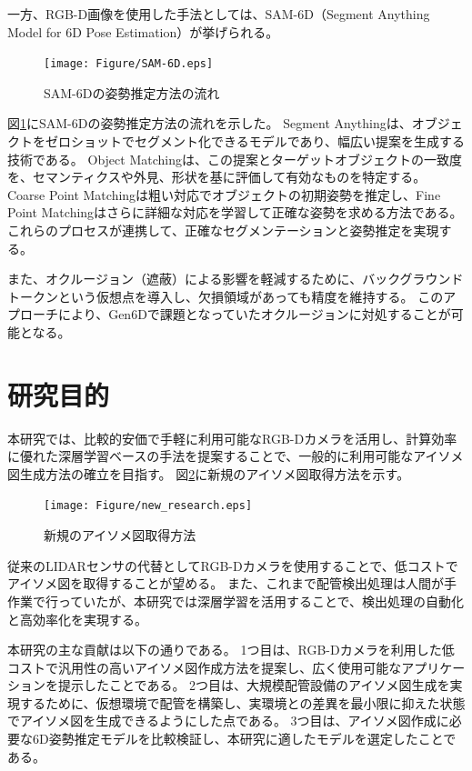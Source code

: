 一方、RGB-D画像を使用した手法としては、SAM-6D（Segment Anything Model for 6D Pose Estimation）が挙げられる。
\begin{figure}[htbt]
	\centering
	 \texttt{[image: Figure/SAM-6D.eps]}
	 \caption{SAM-6Dの姿勢推定方法の流れ}
	 \label{fig:f7}
\end{figure}

図\ref{fig:f7}にSAM-6Dの姿勢推定方法の流れを示した。
Segment Anythingは、オブジェクトをゼロショットでセグメント化できるモデルであり、幅広い提案を生成する技術である。
Object Matchingは、この提案とターゲットオブジェクトの一致度を、セマンティクスや外見、形状を基に評価して有効なものを特定する。
Coarse Point Matchingは粗い対応でオブジェクトの初期姿勢を推定し、Fine Point Matchingはさらに詳細な対応を学習して正確な姿勢を求める方法である。
これらのプロセスが連携して、正確なセグメンテーションと姿勢推定を実現する。

また、オクルージョン（遮蔽）による影響を軽減するために、バックグラウンドトークンという仮想点を導入し、欠損領域があっても精度を維持する。
このアプローチにより、Gen6Dで課題となっていたオクルージョンに対処することが可能となる。


\section{研究目的}
本研究では、比較的安価で手軽に利用可能なRGB-Dカメラを活用し、計算効率に優れた深層学習ベースの手法を提案することで、一般的に利用可能なアイソメ図生成方法の確立を目指す。
図\ref{fig:f8}に新規のアイソメ図取得方法を示す。\\
\begin{figure}[htbt]
	\centering
	 \texttt{[image: Figure/new\_research.eps]}
	 \caption{新規のアイソメ図取得方法}
	 \label{fig:f8}
\end{figure}

従来のLIDARセンサの代替としてRGB-Dカメラを使用することで、低コストでアイソメ図を取得することが望める。
また、これまで配管検出処理は人間が手作業で行っていたが、本研究では深層学習を活用することで、検出処理の自動化と高効率化を実現する。

本研究の主な貢献は以下の通りである。
1つ目は、RGB-Dカメラを利用した低コストで汎用性の高いアイソメ図作成方法を提案し、広く使用可能なアプリケーションを提示したことである。
2つ目は、大規模配管設備のアイソメ図生成を実現するために、仮想環境で配管を構築し、実環境との差異を最小限に抑えた状態でアイソメ図を生成できるようにした点である。
3つ目は、アイソメ図作成に必要な6D姿勢推定モデルを比較検証し、本研究に適したモデルを選定したことである。


